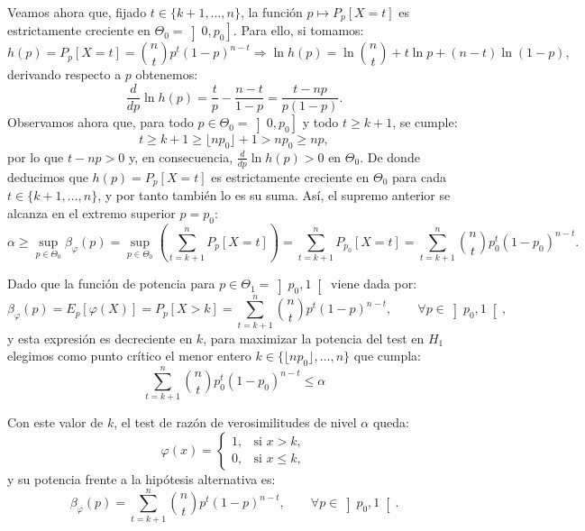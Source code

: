 \begin{ejercicio}
    Veamos ahora que, fijado $t \in \{k + 1, \ldots, n\}$, la función $p \mapsto P_p[X = t]$ es estrictamente creciente en $\Theta_0 = \left]0, p_0\right]$. Para ello, si tomamos:
    \begin{equation*}
        h(p) = P_p[X = t] = \binom{n}{t} p^t (1 - p)^{n - t} \Longrightarrow \ln h(p) = \ln\binom{n}{t} + t\ln p + (n - t)\ln(1 - p),
    \end{equation*}
    derivando respecto a $p$ obtenemos:
    \begin{equation*}
        \frac{d}{dp} \ln h(p) = \frac{t}{p} - \frac{n - t}{1 - p} = \frac{t - np}{p(1 - p)}.
    \end{equation*}
    Observamos ahora que, para todo $p \in \Theta_0 = \left]0, p_0\right]$ y todo $t \geq k + 1$, se cumple:
    \begin{equation*}
        t \geq k + 1 \geq \lfloor np_0 \rfloor + 1 > np_0 \geq np,
    \end{equation*}
    por lo que $t - np > 0$ y, en consecuencia, $\frac{d}{dp}\ln h(p) > 0$ en $\Theta_0$. De donde deducimos que $h(p) = P_p[X = t]$ es estrictamente creciente en $\Theta_0$ para cada $t \in \{k + 1, \ldots, n\}$, y por tanto también lo es su suma. Así, el supremo anterior se alcanza en el extremo superior $p = p_0$:
    \begin{equation*}
        \alpha \geq \sup_{p \in \Theta_0} \beta_\varphi(p) = \sup_{p \in \Theta_0} \left(\sum_{t = k + 1}^{n} P_p[X = t]\right) = \sum_{t = k + 1}^{n} P_{p_0}[X = t] = \sum_{t = k + 1}^{n} \binom{n}{t} p_0^t (1 - p_0)^{n - t}.
    \end{equation*}

    Dado que la función de potencia para $p \in \Theta_1 = \left]p_0, 1\right[$ viene dada por:
    \begin{equation*}
        \beta_\varphi(p) = E_p[\varphi(X)] = P_p[X > k] = \sum_{t = k + 1}^{n} \binom{n}{t} p^t (1 - p)^{n - t}, \qquad \forall p \in \left]p_0, 1\right[,
    \end{equation*}
    y esta expresión es decreciente en $k$, para maximizar la potencia del test en $H_1$ elegimos como punto crítico el menor entero $k \in \{\lfloor np_0 \rfloor, \ldots, n\}$ que cumpla:
    \begin{equation*}
        \sum_{t = k + 1}^{n} \binom{n}{t} p_0^t (1 - p_0)^{n - t} \leq \alpha
    \end{equation*}

    Con este valor de $k$, el test de razón de verosimilitudes de nivel $\alpha$ queda:
    \begin{equation*}
        \varphi(x) =
        \begin{cases}
            1, & \text{si } x > k, \\
            0, & \text{si } x \leq k,
        \end{cases}
    \end{equation*}
    y su potencia frente a la hipótesis alternativa es:
    \begin{equation*}
        \beta_\varphi(p) = \sum_{t = k + 1}^{n} \binom{n}{t} p^t (1 - p)^{n - t}, \qquad \forall p \in \left]p_0, 1\right[.
    \end{equation*}
\end{ejercicio}

